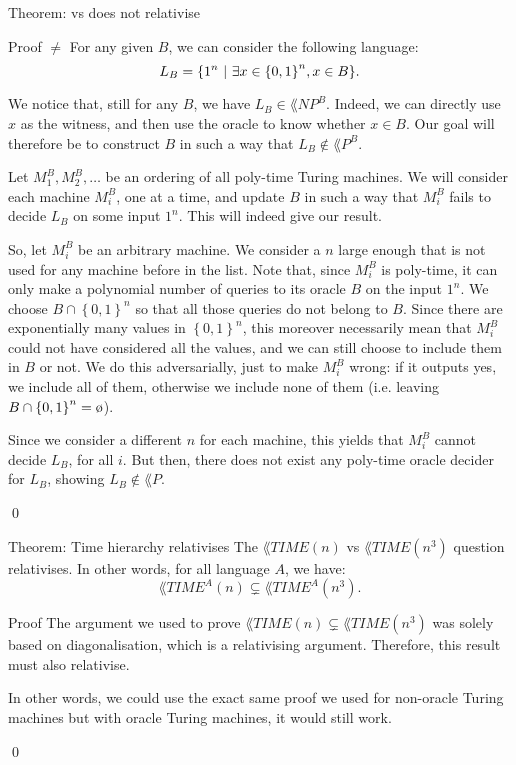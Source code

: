 \documentclass[a4paper]{article}
\begin{document}
\begin{parag}{Theorem:  vs  does not relativise}
    \begin{subparag}{Proof $\neq$}
        For any given $B$, we can consider the following language: 
        \[L_B = \left\{1^n \suchthat \exists x \in \left\{0, 1\right\}^n, x \in B\right\}.\]

        We notice that, still for any $B$, we have $L_B \in \lang{NP}^B$. Indeed, we can directly use $x$ as the witness, and then use the oracle to know whether $x \in B$. Our goal will therefore be to construct $B$ in such a way that $L_B \not \in \lang{P}^B$.

        Let $M_1^B, M_2^B, \ldots$ be an ordering of all poly-time Turing machines. We will consider each machine $M_i^B$, one at a time, and update $B$ in such a way that $M_i^B$ fails to decide $L_B$ on some input $1^n$. This will indeed give our result. 

        So, let $M_i^B$ be an arbitrary machine. We consider a $n$ large enough that is not used for any machine before in the list. Note that, since $M_i^B$ is poly-time, it can only make a polynomial number of queries to its oracle $B$ on the input $1^n$. We choose $B \cap \left\{0, 1\right\}^n$ so that all those queries do not belong to $B$. Since there are exponentially many values in $\left\{0, 1\right\}^n$, this moreover necessarily mean that $M_i^B$ could not have considered all the values, and we can still choose to include them in $B$ or not. We do this adversarially, just to make $M_i^B$ wrong: if it outputs yes, we include all of them, otherwise we include none of them (i.e. leaving $B \cap \left\{0, 1\right\}^n = \o$).

        Since we consider a different $n$ for each machine, this yields that $M_i^B$ cannot decide $L_B$, for all $i$. But then, there does not exist any poly-time oracle decider for $L_B$, showing $L_B \not \in \lang{P}$.

        \qed
    \end{subparag}
\end{parag}

\begin{parag}{Theorem: Time hierarchy relativises}
    The $\lang{TIME}\left(n\right)$ vs $\lang{TIME}\left(n^3\right)$ question relativises. In other words, for all language $A$, we have: 
    \[\lang{TIME}^A\left(n\right) \subsetneq \lang{TIME}^A\left(n^3\right).\]
    
    \begin{subparag}{Proof}
        The argument we used to prove $\lang{TIME}\left(n\right) \subsetneq \lang{TIME}\left(n^3\right)$ was solely based on diagonalisation, which is a relativising argument. Therefore, this result must also relativise.

        In other words, we could use the exact same proof we used for non-oracle Turing machines but with oracle Turing machines, it would still work.

        \qed
    \end{subparag}
\end{parag}
\end{document}
